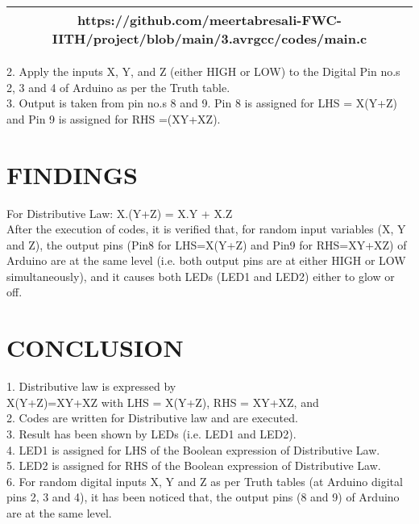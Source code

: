 \documentclass[conference]{IEEEtran}
\begin{document}
\begin{table}[h]
\centering
\begin{tabular}{| c |} \hline
\rule{0pt}{20pt} 
https://github.com/meertabresali-FWC-IITH/project/blob/main/3.avrgcc/codes/main.c \\
\hline

 \end{tabular}
\end{table}
\begin{flushleft}
2. Apply the inputs X, Y, and Z (either HIGH or LOW) to the Digital Pin no.s 2, 3 and 4 of Arduino as per the Truth table.\\
\vspace{0.4cm}
3. Output is taken from pin no.s 8 and 9. Pin 8 is assigned for LHS = X(Y+Z) and Pin 9 is assigned for RHS =(XY+XZ). 
\end{flushleft}

\section{FINDINGS}
\begin{flushleft}
For Distributive Law: X.(Y+Z) = X.Y + X.Z \\
\vspace{0.3cm}
After the execution of codes, it is verified that, for random input variables (X, Y and Z), the output pins (Pin8 for LHS=X(Y+Z) and Pin9 for RHS=XY+XZ) of Arduino are at the same level (i.e. both output pins are at either HIGH or LOW simultaneously), and it causes both LEDs (LED1 and LED2) either to glow or off.\\

\end{flushleft}
\section{CONCLUSION}
\begin{flushleft}
1. Distributive law is expressed by \\
X(Y+Z)=XY+XZ with LHS = X(Y+Z), RHS = XY+XZ, and \\
2. Codes are written for Distributive law and are executed.\\
3. Result has been shown by LEDs (i.e. LED1 and LED2). \\
4. LED1 is assigned for LHS of the Boolean expression of Distributive Law. \\
5. LED2 is assigned for RHS of the Boolean expression of Distributive Law. \\
6. For random digital inputs X, Y and Z as per Truth tables (at Arduino digital pins 2, 3 and 4), it has been noticed that, the output pins (8 and 9) of Arduino are at the same level.
\end{flushleft}
\end{document}
